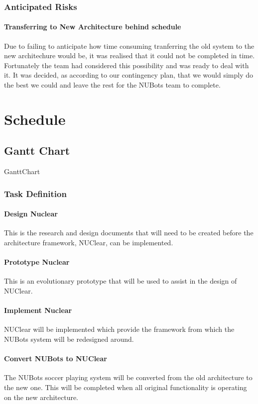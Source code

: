 \documentclass[a4paper]{article}
\begin{document}
			\subsubsection{Anticipated Risks}
				\paragraph{Transferring to New Architecture behind schedule}  
					Due to failing to anticipate how time consuming tranferring the old system to the new architechure would be, it was realised that it could not be completed in time. Fortunately the team had considered this possibility and was ready to deal with it. It was decided, as according to our contingency plan, that we would simply do the best we could and leave the rest for the NUBots team to complete.

	\section{Schedule}
		\subsection{Gantt Chart}
			{GanttChart}
			\subsubsection{Task Definition}
				\paragraph{Design Nuclear}
					This is the research and design documents that will need to be created before the architecture framework, NUClear, can be implemented.
				\paragraph{Prototype Nuclear}
					This is an evolutionary prototype that will be used to assist in the design of NUClear.
				\paragraph{Implement Nuclear}
					NUClear will be implemented which provide the framework from which the NUBots system will be redesigned around.
				\paragraph{Convert NUBots to NUClear}
					The NUBots soccer playing system will be converted from the old architecture to the new one. This will be completed when all original functionality is operating on the new architecture.
\end{document}
